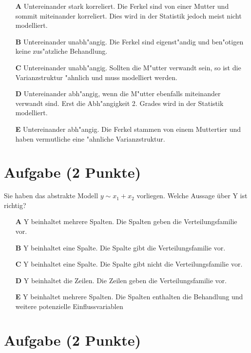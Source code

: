 \documentclass[a4paper, 10pt]{scrartcl}\usepackage[]{graphicx}\usepackage[]{xcolor}
\begin{document}
\begin{enumerate}
\item [\textbf{A} \msquare] Untereinander stark korreliert. Die Ferkel sind von einer Mutter und sommit miteinander korreliert. Dies wird in der Statistik jedoch meist nicht modelliert.
\item [\textbf{B} \msquare] Untereinander unabh{"a}ngig. Die Ferkel sind eigenst{"a}ndig und ben{"o}tigen keine zus{"a}tzliche Behandlung.
\item [\textbf{C} \msquare] Untereinander unabh{"a}ngig. Sollten die M{"u}tter verwandt sein, so ist die Varianzstruktur {"a}hnlich und muss modelliert werden.
\item [\textbf{D} \msquare] Untereinander abh{"a}ngig, wenn die M{"u}tter ebenfalls miteinander verwandt sind. Erst die Abh{"a}ngigkeit 2. Grades wird in der Statistik modelliert.
\item [\textbf{E} \msquare] Untereinander abh{"a}ngig. Die Ferkel stammen von einem Muttertier und haben vermutliche eine {"a}hnliche Varianzstruktur.
\end{enumerate}

\section{Aufgabe \hfill (2 Punkte)}




Sie haben das abstrakte Modell $y \sim x_1 + x_2$ vorliegen. Welche Aussage {\"u}ber
Y ist richtig?



\begin{enumerate}
\item [\textbf{A} \msquare] Y beinhaltet mehrere Spalten. Die Spalten geben die Verteilungsfamilie vor.
\item [\textbf{B} \msquare] Y beinhaltet eine Spalte. Die Spalte gibt die Verteilungsfamilie vor.
\item [\textbf{C} \msquare] Y beinhaltet eine Spalte. Die Spalte gibt nicht die Verteilungsfamilie vor.
\item [\textbf{D} \msquare] Y beinhaltet die Zeilen. Die Zeilen geben die Verteilungsfamilie vor.
\item [\textbf{E} \msquare] Y beinhaltet mehrere Spalten. Die Spalten enthalten die Behandlung und weitere potenzielle Einflussvariablen
\end{enumerate}

\section{Aufgabe \hfill (2 Punkte)}
\end{document}
